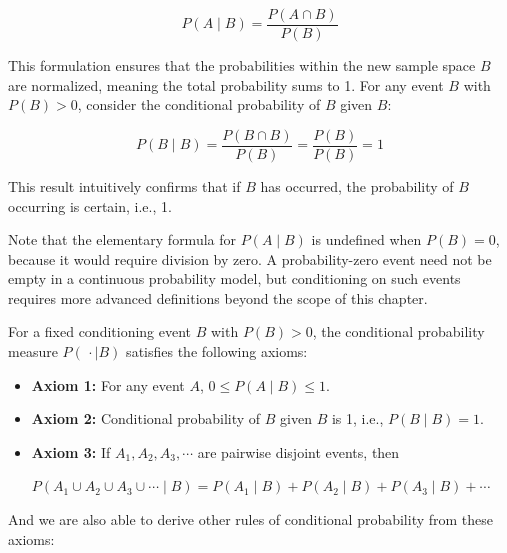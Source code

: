 \[
P(A \mid B) = \frac{P(A \cap B)}{P(B)}
\]

This formulation ensures that the probabilities within the new sample space \( B \) are normalized, meaning the total probability sums to 1. For any event \( B \) with \( P(B)>0 \), consider the conditional probability of \( B \) given \( B \):

\[
P(B \mid B) = \frac{P(B \cap B)}{P(B)} = \frac{P(B)}{P(B)} = 1
\]

This result intuitively confirms that if \( B \) has occurred, the probability of \( B \) occurring is certain, i.e., 1.

Note that the elementary formula for \( P(A \mid B) \) is undefined when \( P(B) = 0 \), because it would require division by zero. A probability-zero event need not be empty in a continuous probability model, but conditioning on such events requires more advanced definitions beyond the scope of this chapter.

For a fixed conditioning event \( B \) with \( P(B)>0 \), the conditional probability measure \(P(\,\cdot \mid B)\) satisfies the following axioms:

\begin{axiom}
    \begin{itemize}
        \item \textbf{Axiom 1:} For any event \(A\), \( 0 \leq P(A\mid B) \leq 1 \).
        \item \textbf{Axiom 2:} Conditional probability of $B$ given $B$ is 1, i.e., $P(B \mid B)=1$.
        \item \textbf{Axiom 3:} If \(A_1, A_2, A_3, \cdots\) are pairwise disjoint events, then

        \hspace*{2.8em}$P\left(A_1 \cup A_2 \cup A_3 \cup \cdots \mid B\right)=P\left(A_1 \mid B\right)+P\left(A_2 \mid B\right)+P\left(A_3 \mid B\right)+\cdots$
    \end{itemize}
\end{axiom}

And we are also able to derive other rules of conditional probability from these axioms:

